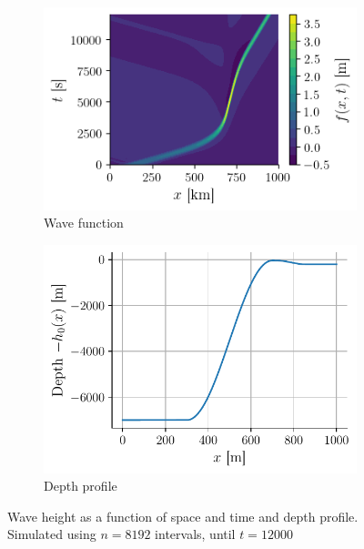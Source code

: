 \begin{figure}[h]
    \centering
    \begin{subfigure}{0.53\linewidth}
        \centering
        \includegraphics[width=\linewidth]{figures/corail_eq1_mouvement_vague.png}
        \caption{Wave function}
        \label{fig:corail_eq1_mouv}
    \end{subfigure}
    \begin{subfigure}{0.46\linewidth}
        \centering
        \includegraphics[width=\linewidth]{figures/corail_eq1_depth.pdf}
        \caption{Depth profile}
        \label{fig:corail_eq1_depth}
    \end{subfigure}
    \caption{Wave height as a function of space and time and depth profile. Simulated using \(n=8192\) intervals, until \(t=12000\)}
\end{figure}

